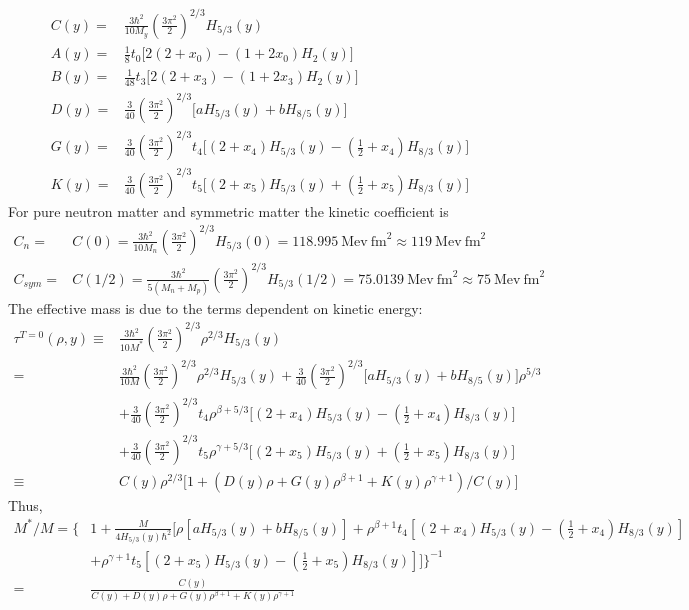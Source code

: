 \documentclass[preprint,prc,preprintnumbers,superscriptaddress,amsmath,amssymb,floatfix]{revtex4-1}
\begin{document}
\begin{equation}
 \begin{split}
  C(y)=&\frac{3\hbar^2}{10M_y}(\frac{3\pi^2}{2})^{2/3} H_{5/3}(y)\\
  A(y)=&\frac{1}{8}t_0 \Big[2(2+x_0)-(1+2x_0)H_2(y)\Big]\\
  B(y)=&\frac{1}{48}t_3\Big[2(2+x_3)-(1+2x_3)H_2(y)\Big]\\
  D(y)=&\frac{3}{40}(\frac{3 \pi^2}{2})^{2/3}\Big[ a H_{5/3}(y) +b H_{8/5}(y) \Big]\\
  G(y)=&\frac{3}{40}(\frac{3 \pi^2}{2})^{2/3}t_4\Big[ (2+x_4)H_{5/3}(y)-(\frac{1}{2}+x_4)H_{8/3}(y)\Big]\\
  K(y)=&\frac{3}{40}(\frac{3\pi^2}{2})^{2/3}t_5\Big[ (2+x_5)H_{5/3}(y)+(\frac{1}{2}+x_5)H_{8/3}(y) \Big]
 \end{split}
\end{equation}
For pure neutron matter and symmetric matter the kinetic coefficient is 
\begin{equation}
 \begin{split}
C_n =& C(0) = \frac{3\hbar^2}{10M_n}(\frac{3\pi^2}{2})^{2/3}H_{5/3}(0) = 118.995\ \text{Mev}\ \text{fm}^{2} \approx 119\ \text{Mev}\ \text{fm}^{2}\\
C_{sym}=& C(1/2) =  \frac{3\hbar^2}{5(M_n+M_p)}(\frac{3\pi^2}{2})^{2/3}H_{5/3}(1/2) = 75.0139 \ \text{Mev}\ \text{fm}^{2} \approx75\ \text{Mev}\ \text{fm}^{2} 
 \end{split}
\end{equation}
The effective mass is due to the terms dependent on kinetic energy:
\begin{equation}
 \begin{split}
  \tau^{T=0}(\rho,y) \equiv& \frac{3\hbar^2}{10M^{*}}(\frac{3\pi^2}{2})^{2/3}\rho^{2/3} H_{5/3}(y)\\
  =&\frac{3\hbar^2}{10M}(\frac{3\pi^2}{2})^{2/3}\rho^{2/3} H_{5/3}(y) +\frac{3}{40}(\frac{3 \pi^2}{2})^{2/3}\Big[ a H_{5/3}(y) +b H_{8/5}(y) \Big]\rho^{5/3}\\
  &+\frac{3}{40}(\frac{3 \pi^2}{2})^{2/3}t_4\rho^{\beta+5/3}\Big[ (2+x_4)H_{5/3}(y)-(\frac{1}{2}+x_4)H_{8/3}(y)\Big]\\
 &+\frac{3}{40}(\frac{3\pi^2}{2})^{2/3}t_5\rho^{\gamma+5/3}\Big[ (2+x_5)H_{5/3}(y)+(\frac{1}{2}+x_5)H_{8/3}(y) \Big]\\
 \equiv& C(y)\rho^{2/3} \Big[1 +( D(y) \rho + G(y) \rho^{\beta+1} + K(y)\rho^{\gamma+1})/C(y)\Big]
 \end{split}
\end{equation}
Thus,
\begin{equation}
 \begin{split}
  M^{*}/M= \{&1+\frac{M}{4 H_{5/3}(y) \hbar^2}\Big[ \rho[a H_{5/3}(y) +b H_{8/5}(y)]+\rho^{\beta+1} t_4[ (2+x_4)H_{5/3}(y)-(\frac{1}{2}+x_4)H_{8/3}(y)]\\
  &+\rho^{\gamma+1} t_5[ (2+x_5)H_{5/3}(y)-(\frac{1}{2}+x_5)H_{8/3}(y)]\Big]\}^{-1}\\
  =&\frac{C(y)}{C(y)+ D(y) \rho + G(y) \rho^{\beta+1} + K(y)\rho^{\gamma+1}}
 \end{split}
\end{equation}
\end{document}
